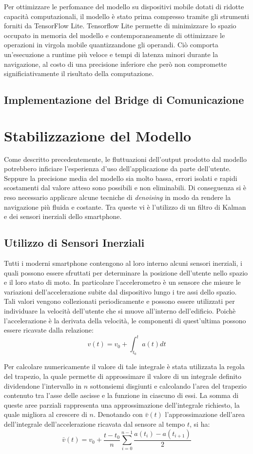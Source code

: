 Per ottimizzare le perfomance del modello su dispositivi mobile dotati di
ridotte capacità computazionali, il modello è stato prima compresso tramite
gli strumenti forniti da TensorFlow Lite\cite{tensorflow-lite}. Tensorflow Lite
permette di minimizzare lo spazio occupato in memoria del modello e
contemporaneamente di ottimizzare le operazioni in virgola mobile
quantizzandone gli operandi. Ciò comporta un'esecuzione a runtime più veloce e
tempi di latenza minori durante la navigazione, al costo di una precisione
inferiore che però non compromette significiativamente il risultato della
computazione.
\subsection{Implementazione del Bridge di Comunicazione}
\section{Stabilizzazione del Modello}
Come descritto precedentemente, le fluttuazioni dell'output prodotto dal
modello potrebbero inficiare l'esperienza d'uso dell'applicazione da parte
dell'utente. Seppure la precisione media del modello sia molto bassa, errori
isolati e rapidi scostamenti dal valore atteso sono possibili e non
eliminabili. Di conseguenza si è reso necessario applicare alcune tecniche di
\emph{denoising} in modo da rendere la navigazione più fluida e costante. Tra
queste vi è l'utilizzo di un filtro di Kalman e dei sensori inerziali dello
smartphone.
\subsection{Utilizzo di Sensori Inerziali}
Tutti i moderni smartphone contengono al loro interno alcuni sensori inerziali,
i quali possono essere sfruttati per determinare la posizione dell'utente nello
spazio e il loro stato di moto. In particolare l'accelerometro è un sensore che
misure le variazioni dell'accelerazione subite dal dispositivo lungo i tre assi
dello spazio. Tali valori vengono collezionati periodicamente e possono essere
utilizzati per individuare la velocità dell'utente che si muove all'interno
dell'edificio. Poichè l'accelerazione è la derivata della velocità, le
componenti di quest'ultima possono essere ricavate dalla relazione:
\[v(t) = v_0 + \int_{t_0}^t{a(t) dt} \]

Per calcolare numericamente il valore di tale integrale è stata utilizzata la
regola del trapezio, la quale permette di approssimare il valore di un
integrale definito dividendone l'intervallo in \(n\) sottonsiemi disgiunti e
calcolando l'area del trapezio contenuto tra l'asse delle ascisse e la funzione
in ciascuno di essi. La somma di queste aree parziali rappresenta una
approssimazione dell'integrale richiesto, la quale migliora al crescere di
\(n\). Denotando con \(\bar{v}(t)\) l'approssimazione dell'area dell'integrale
dell'accelerazione ricavata dal sensore al tempo \(t\), si ha:
\[ \bar{v}(t) = v_0 + \frac{t - t_0}{n} \sum_{i=0}^{n-1} {\frac{a(t_i) - a(t_{i+1})}{2}} \]

